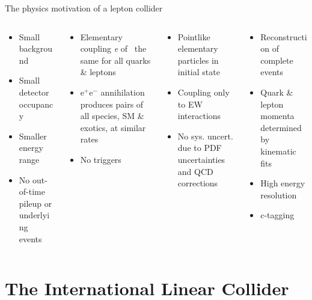 \documentclass[xcolor={dvipsnames}]{beamer}
\begin{document}
\begin{frame}[fragile]{The physics motivation of a lepton collider}
{\begin{overprint}
\begin{columns}
\begin{column}{0.24\textwidth}
\begin{itemize}
\color{JungleGreen}
\item Small background
\item Small detector occupancy
\item Smaller energy range
\item No out-of-time pileup or underlying events
\end{itemize}
\end{column}
\begin{column}{0.26\textwidth}
\begin{itemize}
\color{WildStrawberry}
\item Elementary coupling \textit{e} of \textgamma \, the same for all quarks \& leptons
\item e$^+$e$^-$ annihilation produces pairs of all species, SM \& exotics, at similar rates
\item No triggers
\end{itemize}
\end{column}
\begin{column}{0.27\textwidth}
\begin{itemize}
\color{Periwinkle}
\item Pointlike elementary particles in initial state
\item Coupling only to EW interactions
\item No sys. uncert. due to PDF uncertainties and QCD corrections
\end{itemize}
\end{column}
\begin{column}{0.27\textwidth}
\begin{itemize}
\color{LimeGreen}
\item Reconstruction of complete events
\item Quark \& lepton momenta determined by kinematic fits
\item High energy resolution
\item c-tagging
\end{itemize}
\end{column}
\end{columns}
\end{overprint}
}%
\end{frame}

\section{The International Linear Collider}
\end{document}
